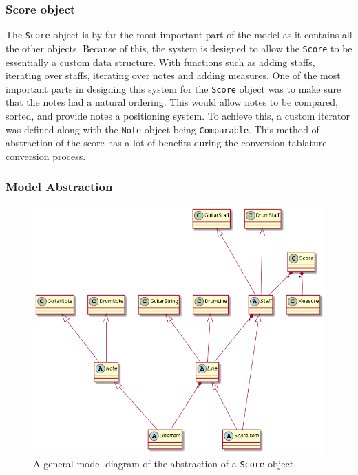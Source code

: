 \documentclass[11pt]{article}
\begin{document}
\subsubsection{Score object}
\label{sec:org226d26e}
The \texttt{Score} object is by far the most important part of the model as it contains all the other objects. Because of this, the system is designed to allow the \texttt{Score} to be essentially a custom data structure. With functions such as adding staffs, iterating over staffs, iterating over notes and
adding measures. One of the most important parts in designing this system for the \texttt{Score} object was to make sure that the notes had a natural ordering. This would allow notes to be compared, sorted, and provide notes a positioning system. To achieve this, a custom iterator was defined along with the \texttt{Note} object being \texttt{Comparable}. This method of abstraction of the score has a lot of benefits during the conversion tablature conversion process.

\newpage

\subsubsection{Model Abstraction}
\label{sec:orgb54c54f}
\begin{figure}[htbp]
\centering
\includegraphics[width=.9\linewidth]{./Diagrams/backend-model-abstraction.png}
\caption{A general model diagram of the abstraction of a \texttt{Score} object.}
\end{figure}

\newpage
\end{document}
